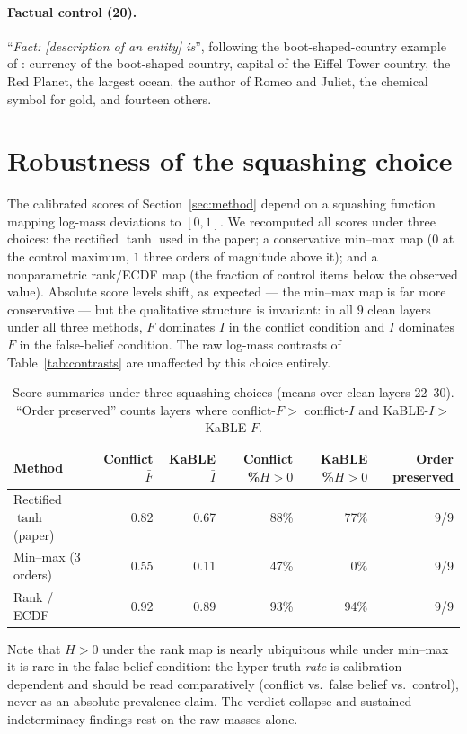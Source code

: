 \documentclass[11pt]{article}
\begin{document}
\paragraph{Factual control (20).} ``\emph{Fact: [description of an entity]
is}'', following the boot-shaped-country example of
\cite{anthropic2026workspace}: currency of the boot-shaped country, capital
of the Eiffel Tower country, the Red Planet, the largest ocean, the author
of Romeo and Juliet, the chemical symbol for gold, and fourteen others.

\section{Robustness of the squashing choice}\label{app:robustness}

The calibrated scores of Section~\ref{sec:method} depend on a squashing
function mapping log-mass deviations to $[0,1]$. We recomputed all scores
under three choices: the rectified $\tanh$ used in the paper; a conservative
min--max map ($0$ at the control maximum, $1$ three orders of magnitude
above it); and a nonparametric rank/ECDF map (the fraction of control items
below the observed value). Absolute score levels shift, as expected --- the
min--max map is far more conservative --- but the qualitative structure is
invariant: in all $9$ clean layers under all three methods, $F$ dominates
$I$ in the conflict condition and $I$ dominates $F$ in the false-belief
condition. The raw log-mass contrasts of Table~\ref{tab:contrasts} are
unaffected by this choice entirely.

\begin{table}[h]
\centering\small
\caption{Score summaries under three squashing choices (means over clean
layers 22--30). ``Order preserved'' counts layers where conflict-$F >$
conflict-$I$ and KaBLE-$I >$ KaBLE-$F$.}
\begin{tabular}{lrrrrr}
\toprule
Method & Conflict $\bar F$ & KaBLE $\bar I$ & Conflict \%$H{>}0$ &
KaBLE \%$H{>}0$ & Order preserved \\
\midrule
Rectified $\tanh$ (paper) & 0.82 & 0.67 & 88\% & 77\% & 9/9 \\
Min--max (3 orders)       & 0.55 & 0.11 & 47\% & 0\%  & 9/9 \\
Rank / ECDF               & 0.92 & 0.89 & 93\% & 94\% & 9/9 \\
\bottomrule
\end{tabular}
\end{table}

Note that $H > 0$ under the rank map is nearly ubiquitous while under
min--max it is rare in the false-belief condition: the hyper-truth
\emph{rate} is calibration-dependent and should be read comparatively
(conflict vs.\ false belief vs.\ control), never as an absolute prevalence
claim. The verdict-collapse and sustained-indeterminacy findings rest on the
raw masses alone.
\end{document}
